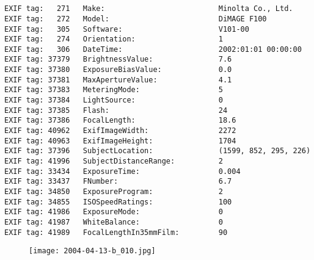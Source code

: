\section{\protect{}}
\noindent 
\noindent
\begin{lstlisting}
EXIF tag:   271   Make:                          Minolta Co., Ltd.
EXIF tag:   272   Model:                         DiMAGE F100
EXIF tag:   305   Software:                      V101-00
EXIF tag:   274   Orientation:                   1
EXIF tag:   306   DateTime:                      2002:01:01 00:00:00
EXIF tag: 37379   BrightnessValue:               7.6
EXIF tag: 37380   ExposureBiasValue:             0.0
EXIF tag: 37381   MaxApertureValue:              4.1
EXIF tag: 37383   MeteringMode:                  5
EXIF tag: 37384   LightSource:                   0
EXIF tag: 37385   Flash:                         24
EXIF tag: 37386   FocalLength:                   18.6
EXIF tag: 40962   ExifImageWidth:                2272
EXIF tag: 40963   ExifImageHeight:               1704
EXIF tag: 37396   SubjectLocation:               (1599, 852, 295, 226)
EXIF tag: 41996   SubjectDistanceRange:          2
EXIF tag: 33434   ExposureTime:                  0.004
EXIF tag: 33437   FNumber:                       6.7
EXIF tag: 34850   ExposureProgram:               2
EXIF tag: 34855   ISOSpeedRatings:               100
EXIF tag: 41986   ExposureMode:                  0
EXIF tag: 41987   WhiteBalance:                  0
EXIF tag: 41989   FocalLengthIn35mmFilm:         90

\end{lstlisting}
\clearpage
\begin{figure}
\raggedleft
\texttt{[image: 2004-04-13-b\_010.jpg]}
\end{figure}


\clearpage
